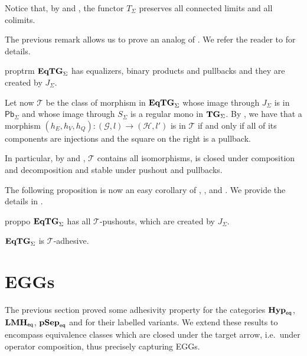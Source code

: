 \documentclass[3p]{elsarticle}
\newcommand{\pbc}{\mathsf{Pb}}
\newcommand{\catname}[1]{\textbf{\textup{#1}}}
\newcommand{\EqHyp}{\catname{Hyp}_{\mathsf{eq}}} %
\newcommand{\EqpsHyp}{\catname{pSep}_{\mathsf{eq}}}
\newcommand{\Eqlmo}{\catname{LMH}_{\mathsf{eq}}}
\newcommand{\EqTG}{\catname{EqTG}}
\newcommand{\tg}[0]{\catname{TG}_{\Sigma}}
\theoremstyle{remark}
\theoremstyle{definition}
\begin{document}
\begin{rem}\label{rem:t}
	Notice that, by  and , the functor $T_\Sigma$ preserves all connected limits and all colimits.
\end{rem}

 The previous remark allows us to prove an analog of . We refer the reader to  for details.
 
 \begin{restatable}{prop}{trm}\label{prop:term}
$\EqTG_{\Sigma}$ has equalizers, binary products and pullbacks and they are created by $J_\Sigma$.
 \end{restatable}
 
\noindent
\begin{minipage}[l]{.8\linewidth}
	Let now $\mathcal{T}$ be the class of morphism in $\EqTG_{\Sigma}$ whose image through $J_\Sigma$ is in $\pbc_\Sigma$ and whose image through $S_\Sigma$ is a regular mono in $\tg$.  By , we have that a morphism $(h_E, h_V, h_Q)\colon (\mathcal{G},l)\to (\mathcal{H}, l')$ is in $\mathcal{T}$ if and only if all of its components are injections and the square on the right is a pullback.
\end{minipage} \hfill 
\begin{minipage}[r]{.18\linewidth}
\end{minipage} 

In particular, by  and , $\mathcal{T}$ contains all isomorphisms, is closed under composition and decomposition and stable under pushout and pullbacks.

The following proposition is now an easy corollary of , , and . We provide the details in .


\begin{restatable}{prop}{po}\label{prop:po}
$\EqTG_{\Sigma}$ has all $\mathcal{T}$-pushouts, which are created by $J_{\Sigma}$.
\end{restatable}

\begin{cor}\label{cor:tade}
	$\EqTG_{\Sigma}$ is $\mathcal{T}$-adhesive.
\end{cor}

\fi 
\section{EGGs}
\label{eggs}
The previous section proved some adhesivity property for the categories $\EqHyp$, $\Eqlmo$,  $\EqpsHyp$ and for their labelled variants. We extend these results to
encompass equivalence classes which are closed under the target arrow, i.e.~under operator composition, thus precisely capturing EGGs.
\end{document}
